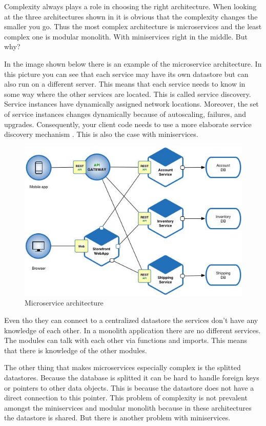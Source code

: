 Complexity always plays a role in choosing the right architecture. When looking at the three architectures shown in  it is obvious that the complexity changes the smaller you go. Thus the most complex architecture is microservices and the least complex one is modular monolith. With miniservices right in the middle. But why?

In the image shown below there is an example of the microservice architecture. In this picture you can see that each service may have its own datastore but can also run on a different server. This means that each service needs to know in some way where the other services are located. This is called service discovery. Service instances have dynamically assigned network locations. Moreover, the set of service instances changes dynamically because of autoscaling, failures, and upgrades. Consequently, your client code needs to use a more elaborate service discovery mechanism \cite{serviceDiscovery}. This is also the case with miniservices.

\begin{figure}[H]
	\includegraphics[width=\linewidth]{microservice-architecture.png}
	\caption{Microservice architecture}
\end{figure}

Even tho they can connect to a centralized datastore the services don’t have any knowledge of each other. In a monolith application there are no different services. The modules can talk with each other via functions and imports. This means that there is knowledge of the other modules.

The other thing that makes microservices especially complex is the splitted datastores. Because the database is splitted it can be hard to handle foreign keys or pointers to other data objects. This is because the datastore does not have a direct connection to this pointer. This problem of complexity is not prevalent amongst the miniservices and modular monolith because in these architectures the datastore is shared. But there is another problem with miniservices.

